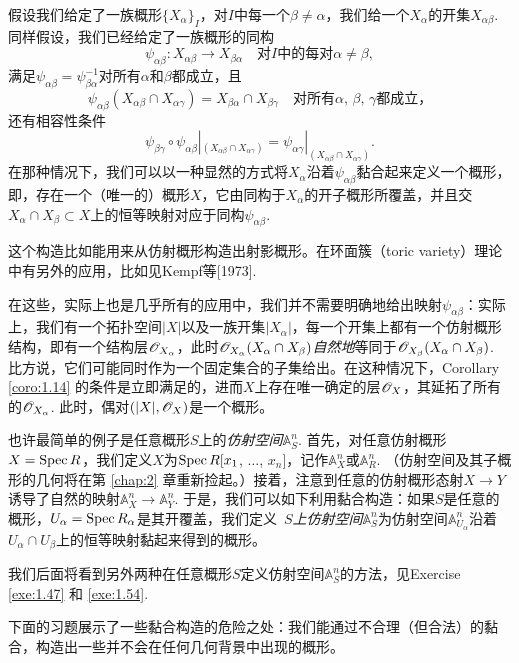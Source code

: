 假设我们给定了一族概形$\{X_\alpha\}_I$，对$I$中每一个$\beta\neq \alpha$，我们给一个$X_\alpha$的开集$X_{\alpha\beta}$. 同样假设，我们已经给定了一族概形的同构
\[
	\psi_{\alpha\beta}:X_{\alpha\beta}\to X_{\beta\alpha}\quad \text{对$I$中的每对$\alpha\neq \beta$},
\]
满足$\psi_{\alpha\beta}=\psi_{\beta\alpha}^{-1}$对所有$\alpha$和$\beta$都成立，且
\[
	\psi_{\alpha\beta}(X_{\alpha\beta}\cap X_{\alpha\gamma})=X_{\beta\alpha}\cap X_{\beta\gamma}\quad \text{对所有$\alpha$, $\beta$, $\gamma$都成立，}
\]
还有相容性条件
\[
	\psi_{\beta\gamma}\circ \psi_{\alpha\beta}|_{(X_{\alpha\beta}\cap X_{\alpha\gamma})}=\psi_{\alpha\gamma}|_{(X_{\alpha\beta}\cap X_{\alpha\gamma})}.
\]
在那种情况下，我们可以以一种显然的方式将$X_\alpha$沿着$\psi_{\alpha\beta}$黏合起来定义一个概形，即，存在一个（唯一的）概形$X$，它由同构于$X_\alpha$的开子概形所覆盖，并且交$X_\alpha\cap X_\beta\subset X$上的恒等映射对应于同构$\psi_{\alpha\beta}$.

这个构造比如能用来从仿射概形构造出射影概形。在环面簇（toric variety）理论中有另外的应用，比如见Kempf等[1973].

在这些，实际上也是几乎所有的应用中，我们并不需要明确地给出映射$\psi_{\alpha\beta}$：实际上，我们有一个拓扑空间$|X|$以及一族开集$|X_\alpha|$，每一个开集上都有一个仿射概形结构，即有一个结构层$\mathscr{O}_{X_\alpha}$，此时$\mathscr{O}_{X_\alpha}(X_\alpha\cap X_\beta)$\textit{自然地}等同于$\mathscr{O}_{X_\beta}(X_\alpha\cap X_\beta)$. 比方说，它们可能同时作为一个固定集合的子集给出。在这种情况下，Corollary \ref{coro:1.14} 的条件是立即满足的，进而$X$上存在唯一确定的层$\mathscr{O}_X$，其延拓了所有的$\mathscr{O}_{X_\alpha}$. 此时，偶对$(|X|,\mathscr{O}_X)$是一个概形。

也许最简单的例子是任意概形$S$上的\textit{仿射空间}$\mathbb{A}^n_S$. 首先，对任意仿射概形$X=\operatorname{Spec} R$，我们定义$X$为$\operatorname{Spec} R[x_1$, $\dots$, $x_n]$，记作$\mathbb{A}_X^n$或$\mathbb{A}_R^n$. （仿射空间及其子概形的几何将在第 \ref{chap:2} 章重新捡起。）接着，注意到任意的仿射概形态射$X\to Y$诱导了自然的映射$\mathbb{A}_X^n\to \mathbb{A}_Y^n$. 于是，我们可以如下利用黏合构造：如果$S$是任意的概形，$U_\alpha=\operatorname{Spec} R_\alpha$是其开覆盖，我们定义~\textit{$S$上仿射空间$\mathbb{A}_S^n$}为仿射空间$\mathbb{A}_{U_\alpha}^n$沿着$U_\alpha\cap U_\beta$上的恒等映射黏起来得到的概形。

我们后面将看到另外两种在任意概形$S$定义仿射空间$\mathbb{A}_S^n$的方法，见Exercise \ref{exe:1.47} 和 \ref{exe:1.54}.

下面的习题展示了一些黏合构造的危险之处：我们能通过不合理（但合法）的黏合，构造出一些并不会在任何几何背景中出现的概形。

